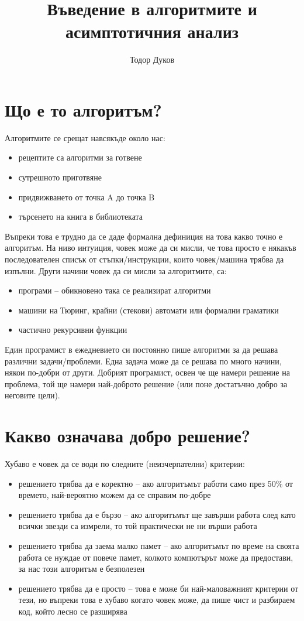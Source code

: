 \documentclass{article}
\title{Въведение в алгоритмите и асимптотичния анализ}
\author{Тодор Дуков}
\date{}
\theoremstyle{definition}
\theoremstyle{plain}
\theoremstyle{remark}
\theoremstyle{definition}
\begin{document}
\maketitle

\section*{Що е то алгоритъм?}

Алгоритмите се срещат навсякъде около нас:
\begin{itemize}
  \item рецептите са алгоритми за готвене
  \item сутрешното приготвяне
  \item придвижването от точка A до точка B
  \item търсенето на книга в библиотеката
\end{itemize}

Въпреки това е трудно да се даде формална дефиниция на това какво точно е алгоритъм.
На ниво интуиция, човек може да си мисли, че това просто е някакъв последователен списък от стъпки/инструкции, които човек/машина трябва да изпълни.
Други начини човек да си мисли за алгоритмите, са:
\begin{itemize}
  \item програми -- обикновено така се реализират алгоритми
  \item машини на Тюринг, крайни (стекови) автомати или формални граматики
  \item частично рекурсивни функции
\end{itemize}

Един програмист в ежедневието си постоянно пише алгоритми за да решава различни задачи/проблеми.
Една задача може да се решава по много начини, някои по-добри от други.
Добрият програмист, освен че ще намери решение на проблема, той ще намери най-доброто решение (или поне достатъчно добро за неговите цели).

\section*{Какво означава добро решение?}

Хубаво е човек да се води по следните (неизчерпателни) критерии:
\begin{itemize}
  \item решението трябва да е коректно -- ако алгоритъмът работи само през 50\% от времето, най-вероятно можем да се справим по-добре
  \item решението трябва да е бързо -- ако алгоритъмът ще завърши работа след като всички звезди са измрели, то той практически не ни върши работа
  \item решението трябва да заема малко памет -- ако алгоритъмът по време на своята работа се нуждае от повече памет, колкото компютърът може да предостави, за нас този алгоритъм е безполезен
  \item решението трябва да е просто -- това е може би най-маловажният критерии от тези, но въпреки това е хубаво когато човек може, да пише чист и разбираем код, който лесно се разширява
\end{itemize}
\end{document}
